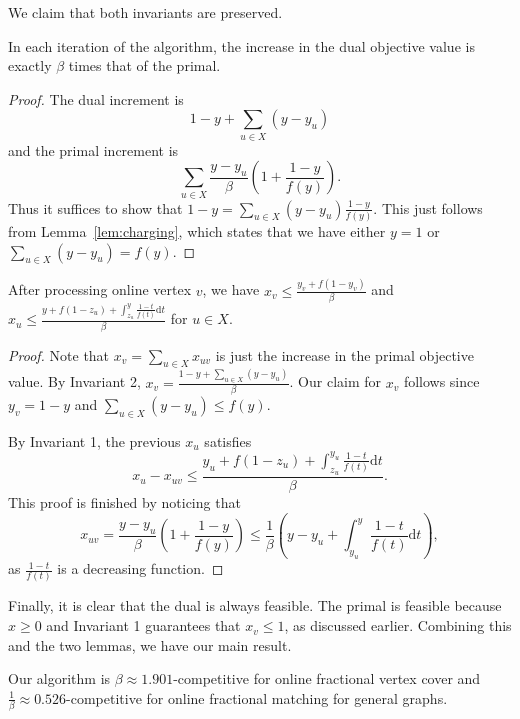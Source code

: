 \documentclass{article}
\begin{document}
We claim that both invariants are preserved.
\begin{lemma}[Invariant 2]
\label{lem:inv2}
In each iteration of the algorithm, the increase in the dual objective value is exactly $\beta$ times that of the primal.
\end{lemma}
\begin{proof}
The dual increment is $$1-y+\sum_{u\in X}(y-y_u)$$ and the primal increment is $$\sum_{u\in X} \frac{y-y_u}{\beta}\left( 1 + \frac{1-y}{f(y)}\right).$$
Thus it suffices to show that $1-y=\sum_{u\in X}(y-y_u)\frac{1-y}{f(y)}$. This just follows from Lemma~\ref{lem:charging}, which states that we have either $y=1$ or $\sum_{u\in X}(y-y_u)=f(y)$.
\end{proof}
\begin{lemma}[Invariant 1]
\label{lem:inv1}
After processing online vertex $v$, we have $x_v\leq \frac{y_v+f(1-y_v)}{\beta}$ and $x_u\leq \frac{y+f(1-z_u)+\int_{z_u}^{y}\frac{1-t}{f(t)}\mathrm{d}t}{\beta}$ for $u\in X$.
\end{lemma}
\begin{proof}
Note that $x_v=\sum_{u\in X}x_{uv}$ is just the increase in the primal objective value. By Invariant 2, $x_v=\frac{1-y+\sum_{u\in X}(y-y_u)}{\beta}$. Our claim for $x_v$ follows since $y_v=1-y$ and $\sum_{u\in X}(y-y_u)\leq f(y)$.

By Invariant 1, the previous $x_u$ satisfies $$x_u-x_{uv}\leq\frac{y_{u}+f(1-z_u)+\int_{z_u}^{y_{u}}\frac{1-t}{f(t)}\mathrm{d}t}{\beta}.$$
This proof is finished by noticing that $$x_{uv}=\frac{y-y_u}{\beta}\left( 1 + \frac{1-y}{f(y)}\right)\leq  \frac{1}{\beta} \left( y-y_u+ \int_{y_u}^y \frac{1-t}{f(t)}\mathrm{d}t\right),$$ as $\frac{1-t}{f(t)}$ is a decreasing function.
\end{proof}

Finally, it is clear that the dual is always feasible. The primal is feasible because $x\geq 0$ and Invariant 1 guarantees that $x_v\leq 1$, as discussed earlier. Combining this and the two lemmas, we have our main result.
\begin{theorem}
\label{thm:pdgeneral}
Our algorithm is $\beta\approx 1.901$-competitive for online fractional vertex cover and $\frac{1}{\beta}\approx 0.526$-competitive for online fractional matching for general graphs.
\end{theorem}
\end{document}
